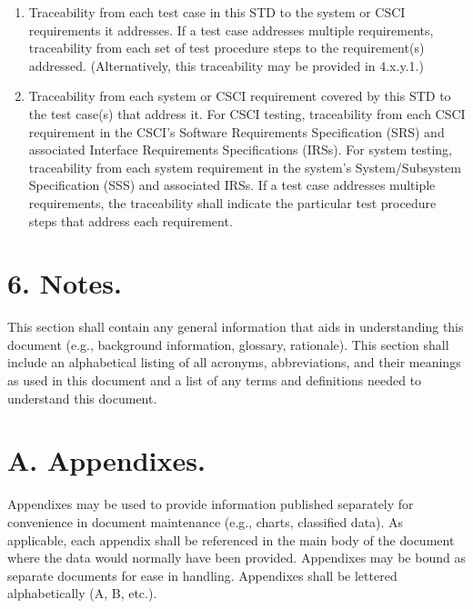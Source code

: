 \begin{enumerate}
\itemsep1pt\parskip0pt
\item
  Traceability from each test case in this STD to the system or CSCI
  requirements it addresses. If a test case addresses multiple
  requirements, traceability from each set of test procedure steps to
  the requirement(s) addressed. (Alternatively, this traceability may be
  provided in 4.x.y.1.)
\item
  Traceability from each system or CSCI requirement covered by this STD
  to the test case(s) that address it. For CSCI testing, traceability
  from each CSCI requirement in the CSCI's Software Requirements
  Specification (SRS) and associated Interface Requirements
  Specifications (IRSs). For system testing, traceability from each
  system requirement in the system's System/Subsystem Specification
  (SSS) and associated IRSs. If a test case addresses multiple
  requirements, the traceability shall indicate the particular test
  procedure steps that address each requirement.
\end{enumerate}

\section{6. Notes.}

This section shall contain any general information that aids in
understanding this document (e.g., background information, glossary,
rationale). This section shall include an alphabetical listing of all
acronyms, abbreviations, and their meanings as used in this document and
a list of any terms and definitions needed to understand this document.

\section{A. Appendixes.}

Appendixes may be used to provide information published separately for
convenience in document maintenance (e.g., charts, classified data). As
applicable, each appendix shall be referenced in the main body of the
document where the data would normally have been provided. Appendixes
may be bound as separate documents for ease in handling. Appendixes
shall be lettered alphabetically (A, B, etc.).
